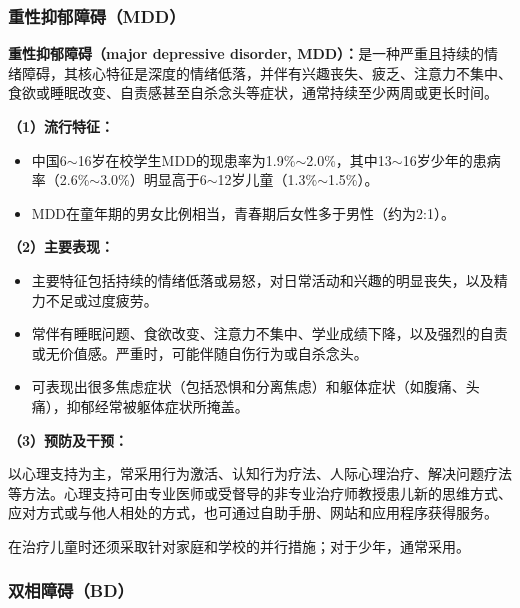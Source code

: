 \subsubsection{重性抑郁障碍（MDD）}

\begin{keybox}
\textbf{重性抑郁障碍（major depressive disorder, MDD）：}是一种严重且持续的情绪障碍，其核心特征是深度的情绪低落，并伴有兴趣丧失、疲乏、注意力不集中、食欲或睡眠改变、自责感甚至自杀念头等症状，通常持续至少两周或更长时间。

\vspace{4pt}
\textbf{（1）流行特征：}

\begin{itemize}[leftmargin=*]
    \item 中国6$\sim$16岁在校学生MDD的现患率为1.9\%$\sim$2.0\%，其中13$\sim$16岁少年的患病率（2.6\%$\sim$3.0\%）明显高于6$\sim$12岁儿童（1.3\%$\sim$1.5\%）。
    \item MDD在童年期的男女比例相当，青春期后女性多于男性（约为2:1）。
\end{itemize}

\vspace{4pt}
\textbf{（2）主要表现：}

\begin{itemize}[leftmargin=*]
    \item 主要特征包括持续的情绪低落或易怒，对日常活动和兴趣的明显丧失，以及精力不足或过度疲劳。
    \item 常伴有睡眠问题、食欲改变、注意力不集中、学业成绩下降，以及强烈的自责或无价值感。严重时，可能伴随自伤行为或自杀念头。
    \item 可表现出很多焦虑症状（包括恐惧和分离焦虑）和躯体症状（如腹痛、头痛），抑郁经常被躯体症状所掩盖。
\end{itemize}

\vspace{4pt}
\textbf{（3）预防及干预：}

以心理支持为主，常采用行为激活、认知行为疗法、人际心理治疗、解决问题疗法等方法。心理支持可由专业医师或受督导的非专业治疗师教授患儿新的思维方式、应对方式或与他人相处的方式，也可通过自助手册、网站和应用程序获得服务。

在治疗儿童时还须采取针对家庭和学校的并行措施；对于少年，通常采用。
\end{keybox}

\subsubsection{双相障碍（BD）}

